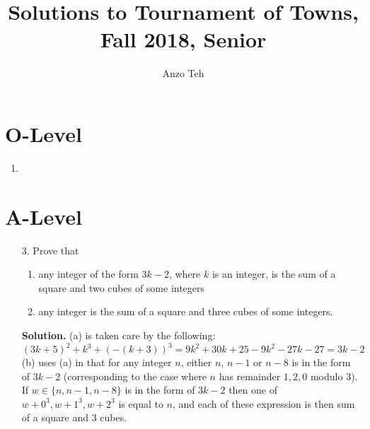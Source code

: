 \documentclass[11pt,a4paper]{article}
\begin{document}
\newcommand{\la}{\leftarrow}
\newcommand{\lra}{\leftrightarrow}
\newcommand{\bbN}{\mathbb{N}}
\newcommand{\bbZ}{\mathbb{Z}}
\newcommand{\dsum}{\displaystyle\sum}
\newcommand{\dprod}{\displaystyle\prod}


\title{Solutions to Tournament of Towns, Fall 2018, Senior}
\author{Anzo Teh}
\date{}
\maketitle

\section*{O-Level}
\begin{enumerate}
	\item
\end{enumerate}

\section*{A-Level}
\begin{enumerate}
	\item[3.]Prove that 
	\begin{enumerate}
		\item any integer of the form $3k - 2$, where $k$ is an integer, is the sum of a square and two cubes of
		some integers
		\item any integer is the sum of a square and three cubes of some integers.
	\end{enumerate}
	
	\textbf{Solution.} (a) is taken care by the following:
	\[
	(3k+5)^2 + k^3 + (-(k+3))^3 = 9k^2+30k+25-9k^2-27k-27=3k-2
	\]
	(b) uses (a) in that for any integer $n$, either $n$, $n-1$ or $n-8$ is in the form of $3k-2$ (corresponding to the case where $n$ has remainder $1, 2, 0$ modulo 3). If $w\in \{n, n-1, n-8\}$ is in the form of $3k-2$ then one of $w+0^3, w+1^3, w+2^3$ is equal to $n$, and each of these expression is then sum of a square and 3 cubes. 
\end{enumerate}
\end{document}
